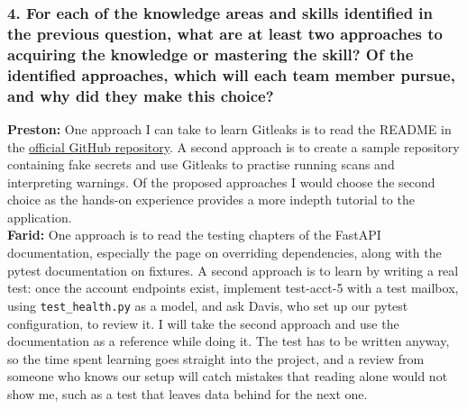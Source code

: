 \documentclass[12pt, titlepage]{article}
\begin{document}
\subsubsection*{4. For each of the knowledge areas and skills identified in the
previous question, what are at least two approaches to acquiring the knowledge
or mastering the skill? Of the identified approaches, which will each team
member pursue, and why did they make this choice?}

\noindent\textbf{Preston:} One approach I can take to learn Gitleaks is to read the README
in the \href{https://github.com/gitleaks/gitleaks}{official GitHub repository}.
A second approach is to create a sample repository containing fake secrets
and use Gitleaks to practise running scans and interpreting warnings.
Of the proposed approaches I would choose the second choice as the
hands-on experience provides a more indepth tutorial to the application.\\

\noindent\textbf{Farid:} One approach is to read the testing chapters of the
FastAPI documentation, especially the page on overriding dependencies, along
with the pytest documentation on fixtures. A second approach is to learn by
writing a real test: once the account endpoints exist, implement test-acct-5
with a test mailbox, using \texttt{test\_health.py} as a model, and ask Davis,
who set up our pytest configuration, to review it. I will take the second
approach and use the documentation as a reference while doing it. The test has
to be written anyway, so the time spent learning goes straight into the
project, and a review from someone who knows our setup will catch mistakes
that reading alone would not show me, such as a test that leaves data behind
for the next one.
\end{document}
